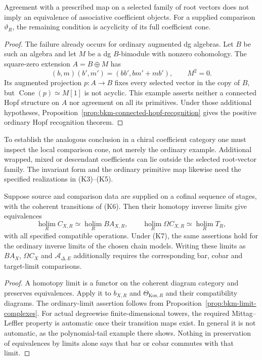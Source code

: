 \begin{proposition}
\label{prop:primitive-restriction-not-koszul}
Agreement with a prescribed map on a selected family of root
vectors does not imply an equivalence of associative coefficient
objects. For a supplied comparison $\vartheta_R$, the remaining
condition is acyclicity of its full coefficient cone.
\end{proposition}
\begin{proof}
The failure already occurs for ordinary augmented dg algebras.
Let $B$ be such an algebra and let $M$ be a dg $B$-bimodule with
nonzero cohomology. The square-zero extension $A=B\oplus M$ has
\[
 (b,m)(b',m')=(bb',bm'+mb'),\qquad M^2=0.
\]
Its augmented projection $p:A\to B$ fixes every selected vector
in the copy of $B$, but
$\operatorname{Cone}(p)\simeq M[1]$ is not acyclic.
This example asserts neither a connected Hopf structure on $A$
nor agreement on all its primitives. Under those additional
hypotheses, Proposition~\ref{prop:bkm-connected-hopf-recognition}
gives the positive ordinary Hopf recognition theorem.
\end{proof}

To establish the analogous conclusion in a chiral coefficient
category one must inspect the local comparison cone, not merely
the ordinary example. Additional wrapped, mixed or descendant
coefficients can lie outside the selected root-vector family.
The invariant form and the ordinary primitive map likewise need
the specified realizations in (K3)--(K5).

\begin{proposition}
\label{prop:chiral-koszul-source-datum-consequence}
Suppose source and comparison data are supplied on a cofinal
sequence of stages, with the coherent transitions of (K6).
Then their homotopy inverse limits give equivalences
\[
 \operatorname*{holim}_R C_{X,R}
       \simeq\operatorname*{holim}_R BA_{X,R},\qquad
 \operatorname*{holim}_R\Omega C_{X,R}
       \simeq\operatorname*{holim}_R T_R,
\]
with all specified compatible operations.
Under (K7), the same assertions hold for the ordinary inverse
limits of the chosen chain models. Writing these limits as
$B A_X$, $\Omega C_X$ and $\mathcal A_{\Delta,E}$ additionally
requires the corresponding bar, cobar and target-limit comparisons.
\end{proposition}
\begin{proof}
A homotopy limit is a functor on the coherent diagram category and
preserves equivalences. Apply it to $b_{X,R}$ and
$\Theta_{\mathrm{Kos},R}$ and their compatibility diagrams.
The ordinary-limit assertion follows from
Proposition~\ref{prop:bkm-limit-complexes}.
For actual degreewise finite-dimensional towers, the required
Mittag--Leffler property is automatic once their transition maps
exist. In general it is not automatic, as the polynomial-tail
example there shows. Nothing in preservation of equivalences by
limits alone says that bar or cobar commutes with that limit.
\end{proof}

